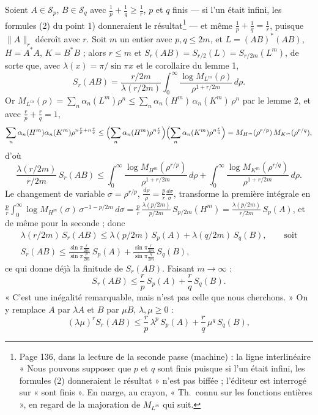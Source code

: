 \documentclass[11pt,a4paper]{article}
\begin{document}
Soient $A \in \mathcal{S}_p$, $B \in \mathcal{S}_q$ avec $\frac1p + \frac1q
\geq \frac1r$, $p$ et $q$ finis --- si l'un était infini, les formules (2)
du point 1) donneraient le résultat\footnote{Page 136, dans la lecture de la
seconde passe (machine) : la ligne interlinéaire « Nous pouvons supposer que
$p$ et $q$ sont finis puisque si l'un était infini, les formules (2)
donneraient le résultat » n'est pas biffée ; l'éditeur est interrogé sur
« sont finis ». En marge, au crayon, « Th.\ connu sur les fonctions
entières », en regard de la majoration de $M_{L^m}$ qui suit.} --- et même $\frac1p +
\frac1q = \frac1r$, puisque $\|A\|_r$ décroît avec $r$. Soit $m$ un entier
avec $p, q \leq 2m$, et $L = (AB)^{*}(AB)$, $H = A^{*}A$, $K = B^{*}B$ ; alors
$r \leq m$ et $S_r(AB) = S_{r/2}(L) = S_{r/2m}(L^m)$, de sorte que, avec
$\lambda(x) = \pi/\sin\pi x$ et le corollaire du lemme 1,
\[
  S_r(AB) = \frac{r/2m}{\lambda(r/2m)}\int_0^\infty
  \frac{\log M_{L^m}(\rho)}{\rho^{1 + r/2m}}\,d\rho .
\]
Or $M_{L^m}(\rho) = \sum_n \alpha_n(L^m)\rho^n \leq \sum_n \alpha_n(H^m)\,
\alpha_n(K^m)\,\rho^n$ par le lemme 2, et avec $\frac{r}{p} + \frac{r}{q} = 1$,
\[
  \sum_n \alpha_n(H^m)\alpha_n(K^m)\rho^{n\frac rp + n\frac rq}
  \leq \Bigl(\sum_n \alpha_n(H^m)\rho^{n\frac rp}\Bigr)\Bigl(\sum_n \alpha_n(K^m)\rho^{n\frac rq}\Bigr)
  = M_{H^m}(\rho^{r/p})\,M_{K^m}(\rho^{r/q}),
\]
d'où
\[
  \frac{\lambda(r/2m)}{r/2m}\,S_r(AB) \leq
  \int_0^\infty \frac{\log M_{H^m}(\rho^{r/p})}{\rho^{1 + r/2m}}\,d\rho
  + \int_0^\infty \frac{\log M_{K^m}(\rho^{r/q})}{\rho^{1 + r/2m}}\,d\rho .
\]
Le changement de variable $\sigma = \rho^{r/p}$, $\frac{d\rho}{\rho} =
\frac{p}{r}\frac{d\sigma}{\sigma}$, transforme la première intégrale en
$\frac{p}{r}\int_0^\infty \log M_{H^m}(\sigma)\,\sigma^{-1-p/2m}\,d\sigma =
\frac{p}{r}\,\frac{\lambda(p/2m)}{p/2m}\,S_{p/2m}(H^m) = \frac{\lambda(p/2m)}{r/2m}
\,S_p(A)$, et de même pour la seconde ; donc
\begin{gather*}
  \lambda(r/2m)\,S_r(AB) \leq \lambda(p/2m)\,S_p(A) + \lambda(q/2m)\,S_q(B),
  \qquad\text{soit} \\
  S_r(AB) \leq \frac{\sin\pi\frac{r}{2m}}{\sin\pi\frac{p}{2m}}\,S_p(A)
  + \frac{\sin\pi\frac{r}{2m}}{\sin\pi\frac{q}{2m}}\,S_q(B),
\end{gather*}
ce qui donne déjà la finitude de $S_r(AB)$. Faisant $m \to \infty$ :
\[
  S_r(AB) \leq \frac{r}{p}\,S_p(A) + \frac{r}{q}\,S_q(B) .
\]
« C'est une inégalité remarquable, mais n'est pas celle que nous
cherchons. » On y remplace $A$ par $\lambda A$ et $B$ par $\mu B$, $\lambda,
\mu \geq 0$ :
\[
  (\lambda\mu)^r S_r(AB) \leq \frac{r}{p}\,\lambda^p\,S_p(A) + \frac{r}{q}\,\mu^q\,S_q(B),
\]
\end{document}
